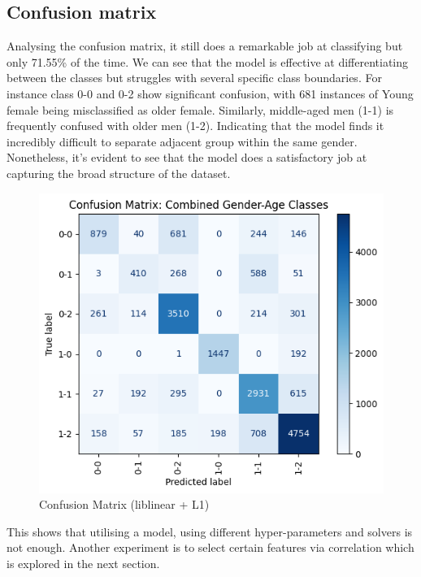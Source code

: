 \documentclass[10pt,twocolumn]{article}
\begin{document}
\subsection{Confusion matrix}
Analysing the confusion matrix, it still does a remarkable job at classifying but only 71.55\% of the time. We can see that the model is effective at differentiating between the classes but struggles with several specific class boundaries. For instance class 0-0 and 0-2 show significant confusion, with 681 instances of Young female being misclassified as older female. Similarly, middle-aged men (1-1) is frequently confused with older men (1-2). Indicating that the model finds it incredibly difficult to separate adjacent group within the same gender. Nonetheless, it's evident to see that the model does a satisfactory job at capturing the broad structure of the dataset.
\begin{figure}[H]
    \centering
    \includegraphics[width=1\linewidth]{images/lr/cm-reduced-data.png}
    \caption{Confusion Matrix (liblinear + L1)}
    \label{fig:cm-liblinear-l1}
\end{figure}
This shows that utilising a model, using different hyper-parameters and solvers is not enough. Another experiment is to select certain features via correlation which is explored in the next section. 
\end{document}
